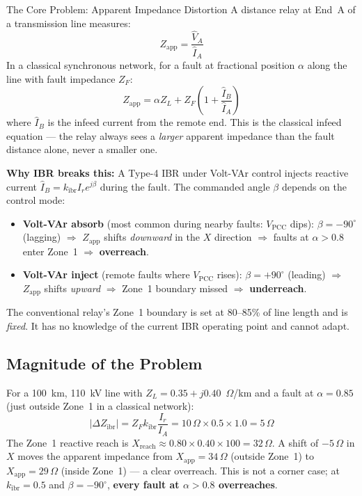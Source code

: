 \documentclass[12pt,a4paper]{article}
\newcommand{\kibr}{k_\mathrm{ibr}}
\newcommand{\Zapp}{Z_\mathrm{app}}
\newcommand{\DZibr}{\Delta Z_\mathrm{ibr}}
\begin{document}
\begin{warnbox}{The Core Problem: Apparent Impedance Distortion}
A distance relay at End~A of a transmission line measures:
\[
  \Zapp = \frac{\hat{V}_A}{\hat{I}_A}
\]
In a classical synchronous network, for a fault at fractional position $\alpha$ along the line with fault impedance $Z_F$:
\[
  \Zapp = \alpha Z_L + Z_F \left(1 + \frac{\hat{I}_B}{\hat{I}_A}\right)
\]
where $\hat{I}_B$ is the infeed current from the remote end. This is the classical infeed equation --- the relay always sees a \emph{larger} apparent impedance than the fault distance alone, never a smaller one.

\textbf{Why IBR breaks this:} A Type-4 IBR under Volt-VAr control injects reactive current $\hat{I}_B = \kibr I_r e^{j\beta}$ during the fault. The commanded angle $\beta$ depends on the control mode:
\begin{itemize}[nosep]
  \item \textbf{Volt-VAr absorb} (most common during nearby faults: $V_\mathrm{PCC}$ dips):
        $\beta = -90^\circ$ (lagging) $\Rightarrow$ $\Zapp$ shifts \emph{downward} in the $X$ direction
        $\Rightarrow$ faults at $\alpha > 0.8$ enter Zone~1 $\Rightarrow$ \textbf{overreach}.
  \item \textbf{Volt-VAr inject} (remote faults where $V_\mathrm{PCC}$ rises):
        $\beta = +90^\circ$ (leading) $\Rightarrow$ $\Zapp$ shifts \emph{upward}
        $\Rightarrow$ Zone~1 boundary missed $\Rightarrow$ \textbf{underreach}.
\end{itemize}
The conventional relay's Zone~1 boundary is set at 80--85\% of line length and is \emph{fixed}. It has no knowledge of the current IBR operating point and cannot adapt.
\end{warnbox}

\subsection{Magnitude of the Problem}

For a 100~km, 110~kV line with $Z_L = 0.35 + j0.40$~$\Omega$/km and a fault at $\alpha = 0.85$ (just outside Zone~1 in a classical network):
\[
  |\DZibr| = Z_F \kibr \frac{I_r}{I_A} = 10\,\Omega \times 0.5 \times 1.0 = 5\,\Omega
\]
The Zone~1 reactive reach is $X_\mathrm{reach} \approx 0.80 \times 0.40 \times 100 = 32\,\Omega$. A shift of $-5\,\Omega$ in $X$ moves the apparent impedance from $X_\mathrm{app} = 34\,\Omega$ (outside Zone~1) to $X_\mathrm{app} = 29\,\Omega$ (inside Zone~1) --- a clear overreach. This is not a corner case; at $\kibr = 0.5$ and $\beta = -90^\circ$, \textbf{every fault at $\alpha > 0.8$ overreaches}.
\end{document}
